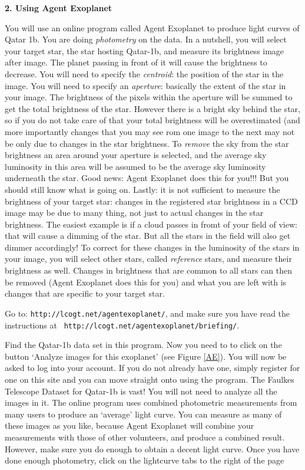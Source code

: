 \bigskip
\noindent
{\bf 2. Using Agent Exoplanet}

You will use an online program called Agent Exoplanet to produce light
curves of Qatar 1b. You are doing \emph{photometry} on the data. In a
nutshell, you will select your target star, the star hosting Qatar-1b,
and measure its brightness image after image. The planet passing in
front of it will cause the brightness to decrease. You will need to
specify the \emph{centroid}: the position of the star in the
image. You will need to specify an \emph{aperture}: basically the
extent of the star in your image. The brightness of the pixels within
the aperture will be summed to get the total brightness of the
star. However there is a bright sky behind the star, so if you do not
take care of that your total brightness will be overestimated (and
more importantly changes that you may see rom one image to the next
may not be only due to changes in the star
brightness. To \emph{remove} the sky from the star brightness an area
around your aperture is selected, and the average sky luminosity in
this area will be assumed to be the average sky luminosity underneath
the star. Good news: Agent Exoplanet does this for you!!! But you
should still know what is going on. Lastly: it is not sufficient to
measure the brightness of your target star: changes in the registered
star brightness in a CCD image may be due to many thing, not just to
actual changes in the star brightness. The easiest example is if a
cloud passes in fromt of your field of view: that will cause a dimming
of the star. But all the stars in the field will also get dimmer
accordingly! To correct for these changes in the luminosity of the
stars in your image, you will select other stars,
called \emph{reference} stars, and measure their brightness as
well. Changes in brightness that are common to all stars can then be
removed (Agent Exoplanet does this for you) and what you are left with
is changes that are specific to your target star.

Go to: {\tt http://lcogt.net/agentexoplanet/}, and make sure you have
read the instructions at {\tt
http://lcogt.net/agentexoplanet/briefing/}.

Find the Qatar-1b data set in this program. Now you need to to click
on the button ‘Analyze images for this exoplanet’ (see
Figure \ref{AE}).  You will now be asked to log into your account. If
you do not already have one, simply register for one on this site and
you can move straight onto using the program.  The Faulkes Telescope
Dataset for Qatar-1b is vast! You will not need to analyze all the
images in it.  The online program uses combined photometric
measurements from many users to produce an ‘average’ light curve.  You
can measure as many of these images as you like, because Agent
Exoplanet will combine your measurements with those of other
volunteers, and produce a combined result.  However, make sure you do
enough to obtain a decent light curve.  Once you have done enough
photometry, click on the lightcurve tabs to the right of the page


